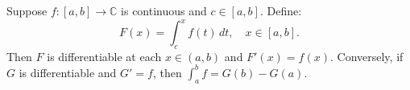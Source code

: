 Suppose $f: [a, b] \to \mathbb{C}$ is continuous and $c \in [a, b]$. Define:
\[
F(x) = \int_c^x f(t)\,dt, \quad x \in [a, b].
\]
Then $F$ is differentiable at each $x \in (a, b)$ and $F'(x) = f(x)$. Conversely, if $G$ is differentiable and $G' = f$, then $\int_a^b f = G(b) - G(a)$.
